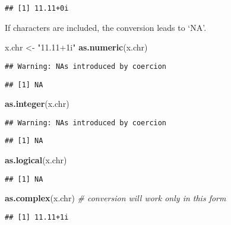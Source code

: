 \documentclass[
  12pt,
]{article}
\newenvironment{Shaded}{\begin{snugshade}}{\end{snugshade}}
\newcommand{\CommentTok}[1]{\textcolor[rgb]{0.56,0.35,0.01}{\textit{#1}}}
\newcommand{\FunctionTok}[1]{\textcolor[rgb]{0.13,0.29,0.53}{\textbf{#1}}}
\newcommand{\NormalTok}[1]{#1}
\newcommand{\OtherTok}[1]{\textcolor[rgb]{0.56,0.35,0.01}{#1}}
\newcommand{\StringTok}[1]{\textcolor[rgb]{0.31,0.60,0.02}{#1}}
\begin{document}
\begin{verbatim}
## [1] 11.11+0i
\end{verbatim}

If characters are included, the conversion leads to `NA'.

\begin{Shaded}
\begin{Highlighting}[]
\NormalTok{x.chr }\OtherTok{\textless{}{-}} \StringTok{"11.11+1i"}
\FunctionTok{as.numeric}\NormalTok{(x.chr)  }
\end{Highlighting}
\end{Shaded}

\begin{verbatim}
## Warning: NAs introduced by coercion
\end{verbatim}

\begin{verbatim}
## [1] NA
\end{verbatim}

\begin{Shaded}
\begin{Highlighting}[]
\FunctionTok{as.integer}\NormalTok{(x.chr)}
\end{Highlighting}
\end{Shaded}

\begin{verbatim}
## Warning: NAs introduced by coercion
\end{verbatim}

\begin{verbatim}
## [1] NA
\end{verbatim}

\begin{Shaded}
\begin{Highlighting}[]
\FunctionTok{as.logical}\NormalTok{(x.chr)}
\end{Highlighting}
\end{Shaded}

\begin{verbatim}
## [1] NA
\end{verbatim}

\begin{Shaded}
\begin{Highlighting}[]
\FunctionTok{as.complex}\NormalTok{(x.chr)      }\CommentTok{\# conversion will work only in this form}
\end{Highlighting}
\end{Shaded}

\begin{verbatim}
## [1] 11.11+1i
\end{verbatim}
\end{document}
